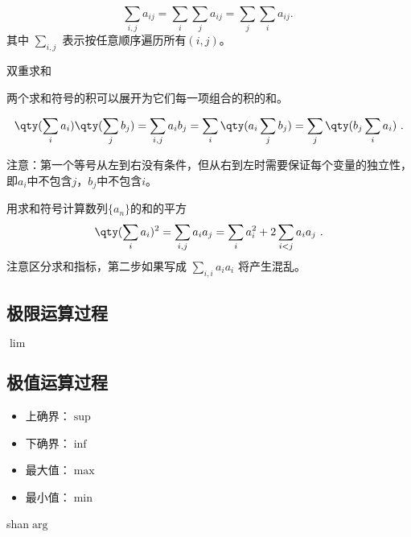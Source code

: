 \begin{equation}
\sum_{i,j} a_{ij}=\sum_{i} \sum_{j} a_{ij} = \sum_{j} \sum_{i} a_{ij}.~
\end{equation}
其中 $\sum\limits_{i,j}$ 表示按任意顺序遍历所有$(i,j)$。

双重求和

两个求和符号的积可以展开为它们每一项组合的积的和。

\begin{equation}
\qty(\sum_i a_i) \qty(\sum_j b_j) = \sum_{i,j} a_i b_j = \sum_i \qty(a_i \sum_j b_j) = \sum_j \qty(b_j \sum_i a_i)~.
\end{equation}

注意：第一个等号从左到右没有条件，但从右到左时需要保证每个变量的独立性，即$a_i$中不包含$j$，$b_j$中不包含$i$。

\begin{example}{用求和符号计算数列$\{a_n\}$的和的平方}
$$\qty(\sum_i a_i)^2 = \sum_{i,j} a_i a_j = \sum_i a_i^2 + 2\sum_{i<j} a_i a_j~.$$
注意区分求和指标，第二步如果写成 $\sum\limits_{i,i} a_i a_i$ 将产生混乱。
\end{example}
\subsection{极限运算过程}

$\lim$

\subsection{极值运算过程}

\begin{itemize}
\item 上确界：$\sup$
\item 下确界：$\inf$
\item 最大值：$\max$
\item 最小值：$\min$
\end{itemize}

shan$\arg$